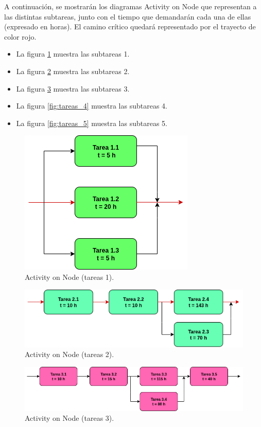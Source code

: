 \documentclass[
11pt, %
]{charter}
\begin{document}
A continuación, se mostrarán los diagramas Activity on Node que representan a las distintas subtareas, junto con el tiempo que demandarán cada una de ellas (expresado en horas). El camino crítico quedará representado por el trayecto de color rojo.

\begin{itemize}
			\item La figura \ref{fig:tareas_1} muestra las subtareas 1.
			\item La figura \ref{fig:tareas_2} muestra las subtareas 2.
			\item La figura \ref{fig:tareas_3} muestra las subtareas 3.
			\item La figura \ref{fig:tareas_4} muestra las subtareas 4.
			\item La figura \ref{fig:tareas_5} muestra las subtareas 5.
	\end{itemize}

\begin{figure}[H]
\centering
\includegraphics[scale=0.6]{./Figuras/tareas_1.png}
\caption{Activity on Node (tareas 1).}
\label{fig:tareas_1}
\end{figure}

\begin{figure}[H]
\centering
\includegraphics[scale=0.6]{./Figuras/tareas_2.png}
\caption{Activity on Node (tareas 2).}
\label{fig:tareas_2}
\end{figure}

\begin{figure}[H]
\centering
\includegraphics[scale=0.6]{./Figuras/tareas_3.png}
\caption{Activity on Node (tareas 3).}
\label{fig:tareas_3}
\end{figure}
\end{document}
